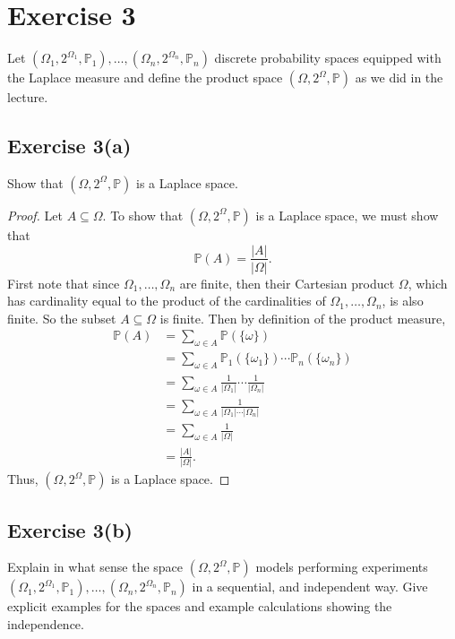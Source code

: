 \documentclass[12pt]{article}
\newenvironment{problem}
    {\begin{lrbox}{\mybox}\begin{minipage}{\textwidth-10pt}}
    {\end{minipage}\end{lrbox}\framebox[\textwidth]{\usebox{\mybox}}}
\renewcommand{\P}{\mathbb{P}}
\begin{document}
\section*{Exercise 3}
\begin{problem}
    Let $(\Omega_1, 2^{\Omega_1}, \P_1),\dots,(\Omega_n, 2^{\Omega_n}, \P_n)$ discrete probability spaces equipped with the Laplace measure and define the product space $(\Omega,2^{\Omega},\P)$ as we did in the lecture.
\end{problem}

\subsection*{Exercise 3(a)}
\begin{problem}
    Show that $(\Omega,2^{\Omega},\P)$ is a Laplace space.
\end{problem}

\begin{proof}
    Let $A\subseteq\Omega$. To show that $(\Omega,2^{\Omega},\P)$ is a Laplace space, we must show that
    \[\P(A) = \frac{|A|}{|\Omega|}.\]
    First note that since $\Omega_1,\dots,\Omega_n$ are finite, then their Cartesian product $\Omega$, which has cardinality equal to the product of the cardinalities of $\Omega_1,\dots,\Omega_n$, is also finite. So the subset $A\subseteq \Omega$ is finite. Then by definition of the product measure,
    \begin{align*}
        \P(A)
            &= \sum_{\omega \in A}\P(\{\omega\}) \\
            &= \sum_{\omega \in A}\P_1(\{\omega_1\})\cdots\P_n(\{\omega_n\}) \\
            &= \sum_{\omega \in A}\frac1{|\Omega_1|} \cdots \frac1{|\Omega_n|} \\
            &= \sum_{\omega \in A}\frac1{|\Omega_1| \cdots |\Omega_n|} \\
            &= \sum_{\omega \in A}\frac1{|\Omega|} \\
            &= \frac{|A|}{|\Omega|}.
    \end{align*}
    Thus, $(\Omega,2^{\Omega},\P)$ is a Laplace space.

\end{proof}

\newpage
\subsection*{Exercise 3(b)}
\begin{problem}
    Explain in what sense the space $(\Omega,2^{\Omega},\P)$ models performing experiments $(\Omega_1, 2^{\Omega_1}, \P_1),\dots,(\Omega_n, 2^{\Omega_n}, \P_n)$ in a sequential, and independent way. Give explicit examples for the spaces and example calculations showing the independence.
\end{problem}
\medskip
\end{document}
